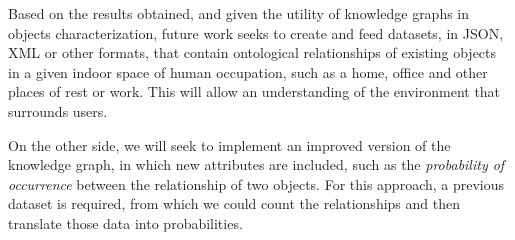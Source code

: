 Based on the results obtained, and given the utility of knowledge graphs 
in objects characterization, future work seeks to create and feed 
datasets, in JSON, XML or other formats, that contain ontological relationships 
of existing objects in a given indoor space of human occupation, such as a home, 
office and other places of rest or work. This will allow an understanding of 
the environment that surrounds users.

On the other side, we will seek to implement an improved version of the 
knowledge graph, in which new attributes are included, such as the 
\textit{probability of occurrence} between the relationship of two objects. 
For this approach, a previous dataset is required, from which we could count 
the relationships and then translate those data into probabilities.